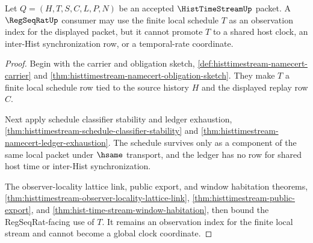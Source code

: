 \begin{theorem}
\label{thm:histtimestream-regseqrat-local-clock-separation}
Let $Q=(H,T,S,C,L,P,N)$ be an accepted $\HistTimeStreamUp$ packet. A $\RegSeqRatUp$ consumer may use the finite local schedule $T$ as an observation index for the displayed packet, but it cannot promote $T$ to a shared host clock, an inter-Hist synchronization row, or a temporal-rate coordinate.
\end{theorem}
\begin{proof}
Begin with the carrier and obligation sketch, \autoref{def:histtimestream-namecert-carrier} and \autoref{thm:histtimestream-namecert-obligation-sketch}. They make $T$ a finite local schedule row tied to the source history $H$ and the displayed replay row $C$.

Next apply schedule classifier stability and ledger exhaustion, \autoref{thm:histtimestream-schedule-classifier-stability} and \autoref{thm:histtimestream-namecert-ledger-exhaustion}. The schedule survives only as a component of the same local packet under $\hsame$ transport, and the ledger has no row for shared host time or inter-Hist synchronization.

The observer-locality lattice link, public export, and window habitation theorems, \autoref{thm:histtimestream-observer-locality-lattice-link}, \autoref{thm:histtimestream-public-export}, and \autoref{thm:hist-time-stream-window-habitation}, then bound the RegSeqRat-facing use of $T$. It remains an observation index for the finite local stream and cannot become a global clock coordinate.
\end{proof}

